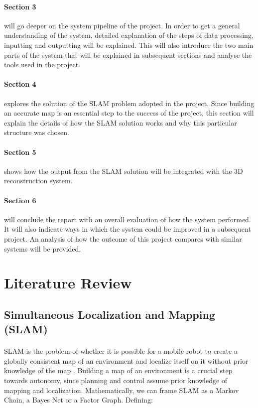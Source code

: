 \documentclass[11pt]{article}
\begin{document}
		\paragraph{Section 3} will go deeper on the system pipeline of the project. In order to get a general understanding of the system, detailed explanation of the steps of data processing, inputting and outputting will be explained. This will also introduce the two main parts of the system that will be explained in subsequent sections and analyse the tools used in the project.
		
		\paragraph{Section 4} explores the solution of the SLAM problem adopted in the project. Since building an accurate map is an essential step to the success of the project, this section will explain the details of how the SLAM solution works and why this particular structure was chosen.
		
		\paragraph{Section 5} shows how the output from the SLAM solution will be integrated with the 3D reconstruction system.
		
		\paragraph{Section 6} will conclude the report with an overall evaluation of how the system performed. It will also indicate ways in which the system could be improved in a subsequent project. An analysis of how the outcome of this project compares with similar systems will be provided.

	\newpage
	\section{Literature Review}
	\subsection{Simultaneous Localization and Mapping (SLAM)}
	\paragraph{}
	SLAM is the problem of whether it is possible for a mobile robot to create a globally consistent map of an environment and localize itself on it without prior knowledge of the map \cite{SLAMPartI}\cite{Cadena}. Building a map of an environment is a crucial step towards autonomy, since planning and control assume prior knowledge of mapping and localization. Mathematically, we can frame SLAM as a Markov Chain, a Bayes Net or a Factor Graph. Defining:
	
\end{document}

